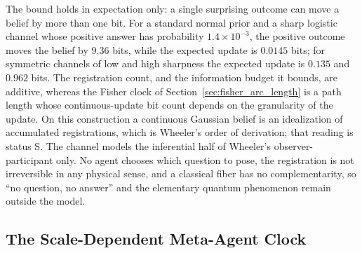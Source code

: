 \documentclass[11pt]{article}
\begin{document}
The bound holds in expectation only: a single surprising outcome can move a belief by more than one bit. For a standard normal prior and a sharp logistic channel whose positive answer has probability $1.4\times10^{-3}$, the positive outcome moves the belief by $9.36$ bits, while the expected update is $0.0145$ bits; for symmetric channels of low and high sharpness the expected update is $0.135$ and $0.962$ bits. The registration count, and the information budget it bounds, are additive, whereas the Fisher clock of Section~\ref{sec:fisher_arc_length} is a path length whose continuous-update bit count depends on the granularity of the update. On this construction a continuous Gaussian belief is an idealization of accumulated registrations, which is Wheeler's order of derivation; that reading is status S. The channel models the inferential half of Wheeler's observer-participant only. No agent chooses which question to pose, the registration is not irreversible in any physical sense, and a classical fiber has no complementarity, so ``no question, no answer'' and the elementary quantum phenomenon remain outside the model.

\subsection{The Scale-Dependent Meta-Agent Clock}
\label{sec:scale_dependent_time}
\end{document}
